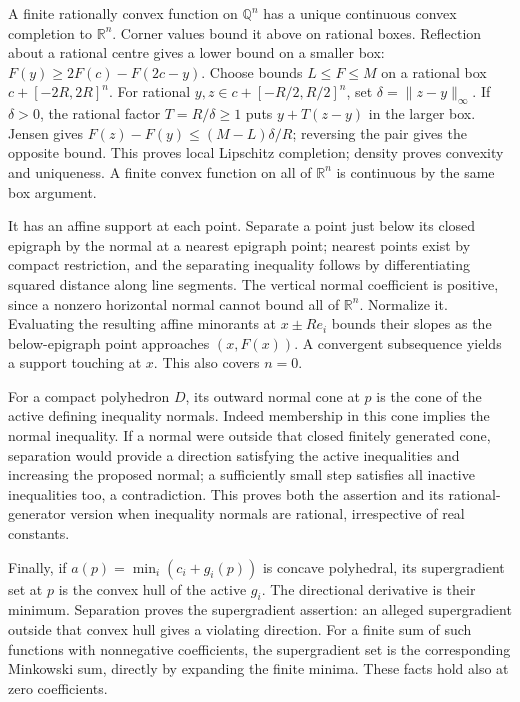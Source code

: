 \documentclass[
  11pt,
]{article}
\begin{document}
A finite rationally convex function on \(\mathbb Q^n\) has a unique
continuous convex completion to \(\mathbb R^n\). Corner values bound it
above on rational boxes. Reflection about a rational centre gives a
lower bound on a smaller box: \(F(y)\geq2F(c)-F(2c-y)\). Choose bounds
\(L\leq F\leq M\) on a rational box \(c+[-2R,2R]^n\). For rational
\(y,z\in c+[-R/2,R/2]^n\), set \(\delta=\|z-y\|_\infty\). If
\(\delta>0\), the rational factor \(T=R/\delta\geq1\) puts \(y+T(z-y)\)
in the larger box. Jensen gives \(F(z)-F(y)\leq(M-L)\delta/R\);
reversing the pair gives the opposite bound. This proves local Lipschitz
completion; density proves convexity and uniqueness. A finite convex
function on all of \(\mathbb R^n\) is continuous by the same box
argument.

It has an affine support at each point. Separate a point just below its
closed epigraph by the normal at a nearest epigraph point; nearest
points exist by compact restriction, and the separating inequality
follows by differentiating squared distance along line segments. The
vertical normal coefficient is positive, since a nonzero horizontal
normal cannot bound all of \(\mathbb R^n\). Normalize it. Evaluating the
resulting affine minorants at \(x\pm Re_i\) bounds their slopes as the
below-epigraph point approaches \((x,F(x))\). A convergent subsequence
yields a support touching at \(x\). This also covers \(n=0\).

For a compact polyhedron \(D\), its outward normal cone at \(p\) is the
cone of the active defining inequality normals. Indeed membership in
this cone implies the normal inequality. If a normal were outside that
closed finitely generated cone, separation would provide a direction
satisfying the active inequalities and increasing the proposed normal; a
sufficiently small step satisfies all inactive inequalities too, a
contradiction. This proves both the assertion and its rational-generator
version when inequality normals are rational, irrespective of real
constants.

Finally, if \(a(p)=\min_i(c_i+g_i(p))\) is concave polyhedral, its
supergradient set at \(p\) is the convex hull of the active \(g_i\). The
directional derivative is their minimum. Separation proves the
supergradient assertion: an alleged supergradient outside that convex
hull gives a violating direction. For a finite sum of such functions
with nonnegative coefficients, the supergradient set is the
corresponding Minkowski sum, directly by expanding the finite minima.
These facts hold also at zero coefficients.
\end{document}
